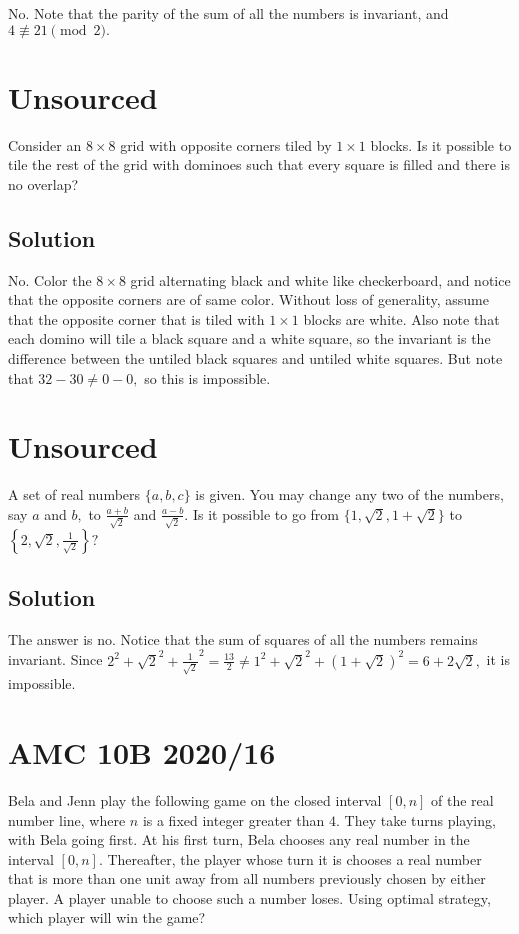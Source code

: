 \documentclass[blue,onecol]{shooting}
\begin{document}
No. Note that the parity of the sum of all the numbers is invariant, and $4\not\equiv21\pmod{2}.$

\section{Unsourced}

Consider an $8\times 8$ grid with opposite corners tiled by $1\times 1$ blocks. Is it possible to tile the rest of the grid with dominoes such that every square is filled and there is no overlap?

\subsection{Solution}

No. Color the $8\times 8$ grid alternating black and white like checkerboard, and notice that the opposite corners are of same color. Without loss of generality, assume that the opposite corner that is tiled with $1\times 1$ blocks are white. Also note that each domino will tile a black square and a white square, so the invariant is the difference between the untiled black squares and untiled white squares. But note that $32-30\neq 0-0,$ so this is impossible.

\section{Unsourced}

A set of real numbers $\{a, b, c\}$ is given. You may change any two of the numbers, say $a$ and $b,$ to $\frac{a+b}{\sqrt{2}}$ and $\frac{a-b}{\sqrt{2}} .$ Is it possible to go from $\{1, \sqrt{2}, 1+\sqrt{2}\}$ to $\left\{2, \sqrt{2}, \frac{1}{\sqrt{2}}\right\} ?$

\subsection{Solution}

The answer is no. Notice that the sum of squares of all the numbers remains invariant. Since $2^2+ \sqrt{2}^2 + \frac{1}{\sqrt{2}}^2 = \frac{13}{2} \neq 1^2 + \sqrt{2}^2 + \left(1+\sqrt{2}\right)^2 = 6+2\sqrt{2},$ it is impossible.

\section{AMC 10B 2020/16}

Bela and Jenn play the following game on the closed interval $[0, n]$ of the real number line, where $n$ is a fixed integer greater than $4$. They take turns playing, with Bela going first. At his first turn, Bela chooses any real number in the interval $[0, n]$. Thereafter, the player whose turn it is chooses a real number that is more than one unit away from all numbers previously chosen by either player. A player unable to choose such a number loses. Using optimal strategy, which player will win the game?
\end{document}

